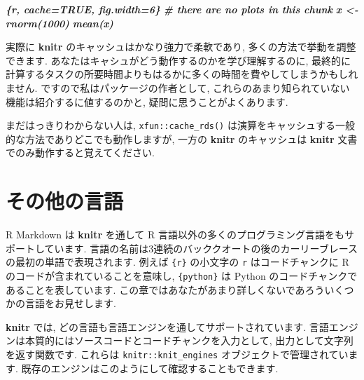 \documentclass[
  11pt,
  lualatex,
  ja=standard]{bxjsreport}
\newenvironment{Shaded}{\begin{snugshade}}{\end{snugshade}}
\newcommand{\FunctionTok}[1]{\textcolor[rgb]{0.00,0.00,0.00}{#1}}
\newcommand{\InformationTok}[1]{\textcolor[rgb]{0.56,0.35,0.01}{\textbf{\textit{#1}}}}
\newcommand{\NormalTok}[1]{#1}
\newcommand{\SpecialCharTok}[1]{\textcolor[rgb]{0.00,0.00,0.00}{#1}}
\begin{document}
\begin{Shaded}
\begin{Highlighting}[]
\InformationTok{\textasciigrave{}\textasciigrave{}\textasciigrave{}\{r, cache=TRUE, fig.width=6\}}
\InformationTok{\# there are no plots in this chunk}
\InformationTok{x \textless{}{-} rnorm(1000)}
\InformationTok{mean(x)}
\InformationTok{\textasciigrave{}\textasciigrave{}\textasciigrave{}}
\end{Highlighting}
\end{Shaded}

実際に \textbf{knitr} のキャッシュはかなり強力で柔軟であり, 多くの方法で挙動を調整できます. あなたはキャシュがどう動作するのかを学び理解するのに, 最終的に計算するタスクの所要時間よりもはるかに多くの時間を費やしてしまうかもしれません. ですので私はパッケージの作者として, これらのあまり知られていない機能は紹介するに値するのかと, 疑問に思うことがよくあります.

まだはっきりわからない人は, \texttt{xfun::cache\_rds()} は演算をキャッシュする一般的な方法でありどこでも動作しますが, 一方の \textbf{knitr} のキャッシュは \textbf{knitr} 文書でのみ動作すると覚えてください.

\hypertarget{other-languages}{%
\chapter{その他の言語}\label{other-languages}}

R Markdown は \textbf{knitr} を通して R 言語以外の多くのプログラミング言語をもサポートしています. 言語の名前は3連続のバッククオートの後のカーリーブレースの最初の単語で表現されます. 例えば \texttt{\textasciigrave{}\textasciigrave{}\textasciigrave{}\{r\}} の小文字の \texttt{r} はコードチャンクに R のコードが含まれていることを意味し, \texttt{\textasciigrave{}\textasciigrave{}\textasciigrave{}\{python\}} は Python のコードチャンクであることを表しています. この章ではあなたがあまり詳しくないであろういくつかの言語をお見せします.

\textbf{knitr} では, どの言語も言語エンジンを通してサポートされています. 言語エンジンは本質的にはソースコードとコードチャンクを入力として, 出力として文字列を返す関数です. これらは \texttt{knitr::knit\_engines} オブジェクトで管理されています. 既存のエンジンはこのようにして確認することもできます.

\begin{Shaded}
\end{Shaded}
\end{document}
